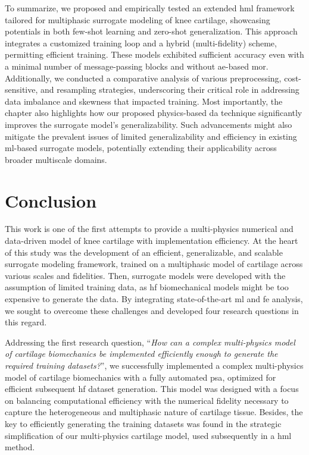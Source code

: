 To summarize, we proposed and empirically tested an extended \ac{hml} framework tailored for multiphasic surrogate modeling of knee cartilage, showcasing potentials in both few-shot learning and zero-shot generalization. This approach integrates a customized training loop and a hybrid (multi-fidelity) scheme, permitting efficient training. These models exhibited sufficient accuracy even with a minimal number of message-passing blocks and without \ac{ae}-based \ac{mor}. Additionally, we conducted a comparative analysis of various preprocessing, cost-sensitive, and resampling strategies, underscoring their critical role in addressing data imbalance and skewness that impacted training. Most importantly, the chapter also highlights how our proposed physics-based \ac{da} technique significantly improves the surrogate model's generalizability. Such advancements might also mitigate the prevalent issues of limited generalizability and efficiency in existing \ac{ml}-based surrogate models, potentially extending their applicability across broader multiscale domains.

\chapter{Conclusion}
%
This work is one of the first attempts to provide a multi-physics numerical and data-driven model of knee cartilage with implementation efficiency. At the heart of this study was the development of an efficient, generalizable, and scalable surrogate modeling framework, trained on a multiphasic model of cartilage across various scales and fidelities. Then, surrogate models were developed with the assumption of limited training data, as \ac{hf} biomechanical models might be too expensive to generate the data. By integrating state-of-the-art \ac{ml} and \ac{fe} analysis, we sought to overcome these challenges and developed four research questions in this regard.

Addressing the first research question, ``\textit{How can a complex multi-physics model of cartilage biomechanics be implemented efficiently enough to generate the required training datasets?}'', we successfully implemented a complex multi-physics model of cartilage biomechanics with a fully automated \ac{psa}, optimized for efficient subsequent \ac{hf} dataset generation. This model was designed with a focus on balancing computational efficiency with the numerical fidelity necessary to capture the heterogeneous and multiphasic nature of cartilage tissue. Besides, the key to efficiently generating the training datasets was found in the strategic simplification of our multi-physics cartilage model, used subsequently in a \ac{hml} method.


